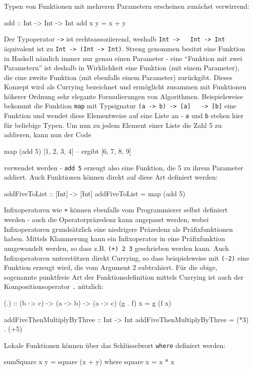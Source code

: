 \documentclass[11pt, a4paper, bibgerm]{scrbook}
\newcommand\icode[1]{\lstinline?#1?}
\begin{document}
Typen von Funktionen mit mehreren Parametern erscheinen
zunächst verwirrend:
\begin{code}
add :: Int -> Int -> Int
add x y = x + y  
\end{code}
Der Typoperator \icode{->} ist rechtsassoziierend, weshalb \icode{Int ->
  Int -> Int} äquivalent ist zu \icode{Int -> (Int -> Int)}. Streng
genommen besitzt eine Funktion in Haskell nämlich immer nur genau einen
Parameter - eine "`Funktion mit zwei Parametern"' ist deshalb in
Wirklichkeit eine Funktion (mit einem Parameter), die eine zweite
Funktion (mit ebenfalls einem Parameter) zurückgibt. Dieses Konzept wird
als Currying bezeichnet und ermöglicht zusammen mit Funktionen höherer
Ordnung sehr elegante Formulierungen von Algorithmen. Beispielsweise
bekommt die Funktion \icode{map} mit Typsignatur \icode{(a -> b) -> [a]
  -> [b]} eine Funktion und wendet diese Elementweise auf eine Liste an
- \icode{a} und \icode{b} stehen hier für beliebige Typen. Um nun zu
jedem Element einer Liste die Zahl 5 zu addieren, kann nun der Code
\begin{code}
map (add 5) [1, 2, 3, 4]  -- ergibt [6, 7, 8, 9]
\end{code}
verwendet werden - \icode{add 5} erzeugt also eine Funktion, die 5 zu
ihrem Parameter addiert. Auch Funktionen können direkt auf diese Art
definiert werden:
\begin{code}
addFiveToList :: [Int] -> [Int]
addFiveToList = map (add 5)
\end{code}

Infixoperatoren wie \icode{+} können ebenfalls vom Programmierer selbst
definiert werden - auch die Operatorpräzedenz kann angepasst werden,
wobei Infixoperatoren grundsätzlich eine niedrigere Präzedenz als
Präfixfunktionen haben. Mittels Klammerung kann ein Infixoperator in eine
Präfixfunktion umgewandelt werden, so dass z.B. \icode{(+) 2 3}
geschrieben werden kann. Auch Infixoperatoren unterstützen direkt
Currying, so dass beispielsweise mit \icode{(-2)} eine Funktion erzeugt
wird, die vom Argument 2 subtrahiert. Für die obige, sogenannte
punktfreie Art der Funktionsdefinition mittels Currying ist auch der
Kompositionsoperator \icode{.} nützlich:
\begin{code}
(.) :: (b -> c) -> (a -> b) -> (a -> c)
(g . f) x = g (f x)

addFiveThenMultiplyByThree :: Int -> Int
addFiveThenMultiplyByThree = (*3) . (+5)
\end{code}

Lokale Funktionen können über das Schlüsselwort \icode{where} definiert
werden:
\begin{code}
sumSquare x y = square (x + y)
  where
    square x = x * x
\end{code}
\end{document}
